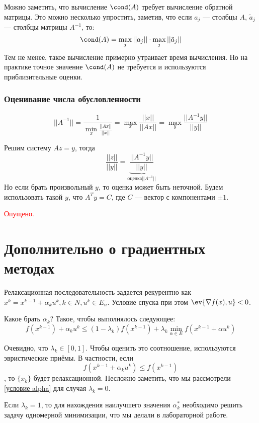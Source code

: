 Можно заметить, что вычисление \(\cond(A)\) требует вычисление обратной матрицы. Это можно несколько упростить, заметив, что если \(a_j\) --- столбцы \(A\), \(\tilde{a}_j\) --- столбцы матрицы \(A^{ - 1}\), то:
\[\cond(A) = \max_j ||a_j|| \cdot \max_j ||\tilde{a}_j||\]
Тем не менее, такое вычисление примерно утраивает время вычисления. Но на практике точное значение \(\cond(A)\) не требуется и используются приблизительные оценки.

\subsubsection{Оценивание числа обусловленности}

\[||A^{ - 1}|| = \frac{1}{\min_x \frac{||Ax||}{||x||}} = \max_x \frac{||x||}{||Ax||} = \max_y \frac{||A^{ - 1}y||}{||y||}\]

Решим систему \(Az = y\), тогда
\[\frac{||z||}{||y||} = \underbrace{\frac{||A^{ - 1}y||}{||y||}}_{\text{оценка} ||A^{-1}||}\]
Но если брать произвольный \(y\), то оценка может быть неточной. Будем использовать такой \(y\), что \(A^T y = C\), где \(C \) --- вектор с компонентами \( \pm 1\).

\begin{example}
    \textcolor{red}{Опущено.}
\end{example}

\section{Дополнительно о градиентных методах}

Релаксационная последовательность задается рекурентно как \(x^k = x^{k - 1} + \alpha_k u^k, k \in N, u^k \in E_n\). Условие спуска при этом \(\ev{\nabla f(x), u} < 0\).

Какое брать \(\alpha_k\)? Такое, чтобы выполнялось следующее:
\begin{equation}
    f(x^{k - 1}) + \alpha_k u^k \leq (1 - \lambda_k) f(x^{k - 1}) + \lambda_k \min_{\alpha \in E} f(x^{k - 1} + \alpha u^k)
    \label{условие alpha}
\end{equation}

Очевидно, что \(\lambda_k \in [0, 1]\). Чтобы оценить это соотношение, используются эвристические приёмы. В частности, если
\[f(x^{k - 1} + \alpha_k u^k) \leq f(x^{k - 1})\]
, то \(\{x_k\}\) будет релаксационной. Несложно заметить, что мы рассмотрели \eqref{условие alpha} для случая \(\lambda_k = 0\).

Если \(\lambda_k = 1\), то для нахождения наилучшего значения \(\alpha_k^*\) необходимо решить задачу одномерной минимизации, что мы делали в лабораторной работе.

